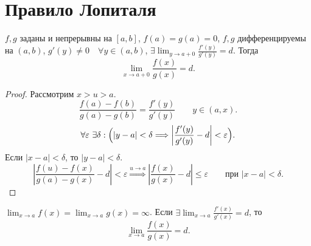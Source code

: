 \documentclass[11pt]{book}
\renewcommand{\le}{\leqslant}
\theoremstyle{definition}
\theoremstyle{plain}
\theoremstyle{plain}
\theoremstyle{definition}
\theoremstyle{remark}
\begin{document}
\section{Правило Лопиталя}
\begin{thm}
    $ f, g$ заданы и непрерывны на $ [a, b]$, $ f(a) = g(a) = 0$,  $f, g $ дифференцируемы на  $ (a, b)$,   $ g'(y) \ne 0 \quad \forall  y \in (a, b)$, $ \exists \lim_{y \to a+0} \frac{f'(y)}{g'(y)} = d $.
    Тогда 
    \[
	\lim_{x \to a +0}\frac{f(x)}{g(x)} = d 
    .\] 
\end{thm}
\begin{proof}
    Рассмотрим $ x > u > a$.
     \[
	 \frac{f(a) - f(b)}{g(a)-g(b)} = \frac{f'(y)}{g'(y)} \qquad y \in (a, x)
    .\] 
    \[
	\forall \varepsilon ~\exists \delta: \Bigl(|y -a| < \delta \Longrightarrow \left| \frac{f'(y)}{g'(y)} - d \right| < \varepsilon \Bigr)
    .\] 
    Если $ |x-a| < \delta $, то $ |y -a|<\delta$. 
    \[
	\left| \frac{f(u)-f(x)}{g(a) -g(x)} - d \right| < \varepsilon \stackrel{u \to  a} \Longrightarrow \left| \frac{f(x)}{g(x)} -d \right| \le \varepsilon \qquad\text{при } |x-a|<\delta
    .\] 
\end{proof}
\begin{thm}
    $ \lim_{x \to  a}f(x)  = \lim_{x \to a}g(x) = \infty $. Если $ \exists \lim_{x \to  a} \frac{f'(x)}{g'(x)} = d $, то 
     \[
	 \lim_{x \to  a} \frac{f(x)}{g(x)} = d
    .\] 
\end{thm}
\end{document}
